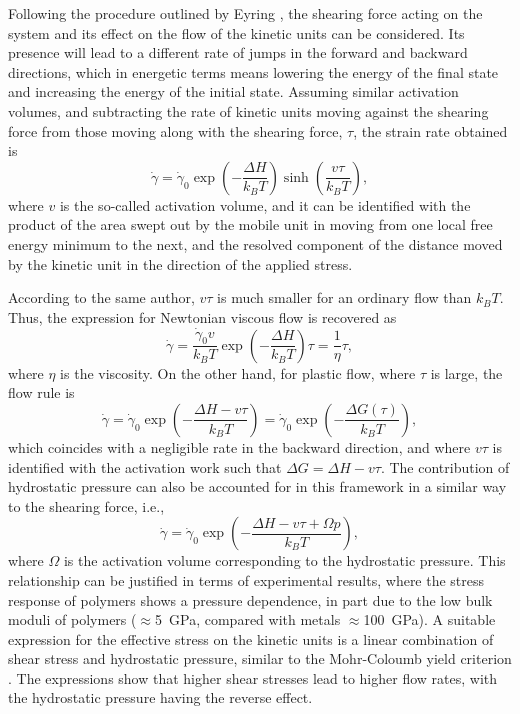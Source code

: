Following the procedure outlined by Eyring \citep{eyringViscosityPlasticityDiffusion1936}, the shearing force acting on the system and its effect on the flow of the kinetic units can be considered.
Its presence will lead to a different rate of jumps in the forward and backward directions, which in energetic terms means lowering the energy of the final state and increasing the energy of the initial state.
Assuming similar activation volumes, and subtracting the rate of kinetic units moving against the shearing force from those moving along with the shearing force, $\tau$, the strain rate obtained is
\begin{equation}
	\label{eq:eyring_model}
	\dot \gamma = \dot\gamma_0 \exp\left(-\frac{\Delta H}{k_BT}\right)\sinh\left(\frac{v\tau}{k_BT}\right),
\end{equation}
where $v$ is the so-called activation volume, and it can be identified with the product of the area swept out by the mobile unit in moving from one local free energy minimum to the next, and the resolved component of the distance moved by the kinetic unit in the direction of the applied stress.

According to the same author, $v\tau$ is much smaller for an ordinary flow than $k_B T$.
Thus, the expression for Newtonian viscous flow is recovered as
\begin{equation}
  \label{eq:newton_fluid_flow_rule_scalar}
	\dot \gamma = \frac{\dot \gamma_0 v}{k_B T}\exp\left(-\frac{\Delta H}{k_BT}\right)\tau=\frac{1}{\eta}\tau,
\end{equation}
where $\eta$ is the viscosity.
On the other hand, for plastic flow, where $\tau$ is large, the flow rule is
\begin{equation}
\label{eq:flow_rule_thermally_activated}
	\dot\gamma = \dot \gamma_0 \exp\left(-\frac{\Delta H - v \tau}{k_B T}\right)=\dot \gamma_0 \exp\left(-\frac{\Delta G(\tau)}{k_B T}\right),
\end{equation}
which coincides with a negligible rate in the backward direction, and where $v\tau$ is identified with the activation work such that $\Delta G = \Delta H - v\tau$.
The contribution of hydrostatic pressure can also be accounted for in this framework in a similar way to the shearing force, i.e.,
\begin{equation}
  \label{eq:eyring_w_pressure}
	\dot\gamma = \dot\gamma_0 \exp\left(-\frac{\Delta H - v \tau + \Omega p}{k_B T}\right),
\end{equation}
where $\Omega$ is the activation volume corresponding to the hydrostatic pressure.
This relationship can be justified in terms of experimental results, where the stress response of polymers shows a pressure dependence, in part due to the low bulk moduli of polymers ($\approx$\SI{5}{\giga\pascal}, compared with metals $\approx$\SI{100}{\giga\pascal}).
A suitable expression for the effective stress on the kinetic units is a linear combination of shear stress and hydrostatic pressure, similar to the Mohr-Coloumb yield criterion \citep{wardIntroductionMechanicalProperties2004}.
The expressions show that higher shear stresses lead to higher flow rates, with the hydrostatic pressure having the reverse effect.

